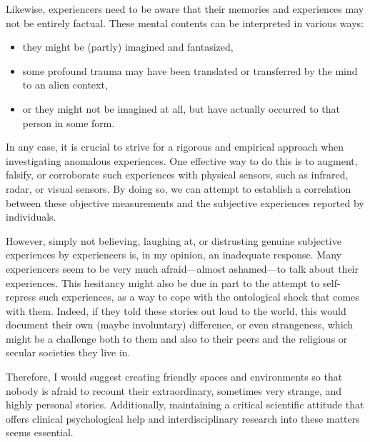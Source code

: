 Likewise, experiencers need to be aware that their memories and experiences may not be entirely factual. These mental contents can be interpreted in various ways:
\begin{itemize}
\item they might be (partly) imagined and fantasized,
\item some profound trauma may have been translated or transferred by the mind to an alien context,
\item or they might not be imagined at all, but have actually occurred to that person in some form.
\end{itemize}
In any case, it is crucial to strive for a rigorous and empirical approach when investigating anomalous experiences. One effective way to do this is to augment, falsify, or corroborate such experiences with physical sensors, such as infrared, radar, or visual sensors. By doing so, we can attempt to establish a correlation between these objective measurements and the subjective experiences reported by individuals.

However, simply not believing, laughing at, or distrusting genuine subjective experiences by experiencers is,
in my opinion, an inadequate response. Many experiencers seem to be very much afraid---almost ashamed---to talk about their experiences.
This hesitancy might also be due in part to the attempt to self-repress such experiences, as a way to cope with the ontological shock that comes with them.
Indeed, if they told these stories out loud to the world, this would document their own (maybe involuntary) difference, or even strangeness,
which might be a challenge both to them and also to their peers and the religious or secular societies they live in.

Therefore, I would suggest creating friendly spaces and environments so that nobody is afraid to recount their extraordinary, sometimes very strange, and highly personal stories. Additionally, maintaining a critical scientific attitude that offers clinical psychological help and interdisciplinary research into these matters seems essential.
